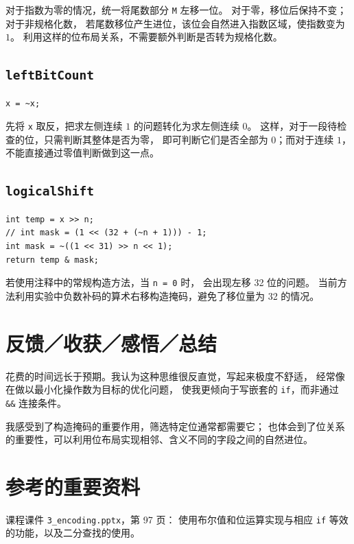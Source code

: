 \documentclass[UTF8,a4paper,11pt,fontset=fandol]{ctexart}
\begin{document}
对于指数为零的情况，统一将尾数部分 \texttt{M} 左移一位。
对于零，移位后保持不变；对于非规格化数，
若尾数移位产生进位，该位会自然进入指数区域，使指数变为 $1$。
利用这样的位布局关系，不需要额外判断是否转为规格化数。

\subsection{\texttt{leftBitCount}}

\begin{lstlisting}
x = ~x;
\end{lstlisting}

先将 \texttt{x} 取反，把求左侧连续 $1$ 的问题转化为求左侧连续 $0$。
这样，对于一段待检查的位，只需判断其整体是否为零，
即可判断它们是否全部为 $0$；而对于连续 $1$，不能直接通过零值判断做到这一点。

\subsection{\texttt{logicalShift}}

\begin{lstlisting}
int temp = x >> n;
// int mask = (1 << (32 + (~n + 1))) - 1;
int mask = ~((1 << 31) >> n << 1);
return temp & mask;
\end{lstlisting}

若使用注释中的常规构造方法，当 \texttt{n = 0} 时，
会出现左移 32 位的问题。
当前方法利用实验中负数补码的算术右移构造掩码，避免了移位量为 32 的情况。

\section{反馈／收获／感悟／总结}

花费的时间远长于预期。我认为这种思维很反直觉，写起来极度不舒适，
经常像在做以最小化操作数为目标的优化问题，
使我更倾向于写嵌套的 \texttt{if}，而非通过 \texttt{\&\&} 连接条件。

我感受到了构造掩码的重要作用，筛选特定位通常都需要它；
也体会到了位关系的重要性，可以利用位布局实现相邻、含义不同的字段之间的自然进位。

\section{参考的重要资料}

课程课件 \texttt{3\_encoding.pptx}，第 97 页：
使用布尔值和位运算实现与相应 \texttt{if} 等效的功能，以及二分查找的使用。
\end{document}
